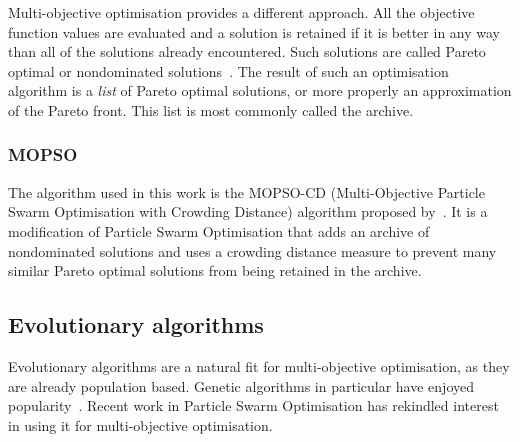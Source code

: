 Multi-objective optimisation provides a different approach.  All the
objective function values are evaluated and a solution is retained if
it is better in any way than all of the solutions already encountered.
Such solutions are called Pareto optimal or nondominated
solutions~\citep{steuer1986multiple}. The result of such an optimisation
algorithm is a \emph{list} of Pareto optimal solutions, or more
properly an approximation of the Pareto front.  This list is most
commonly called the archive.


\subsubsection{MOPSO}\label{sec:mopso}
The algorithm used in this work is the MOPSO-CD (Multi-Objective
Particle Swarm Optimisation with Crowding Distance) algorithm proposed
by~\citet{raquel.naval2005effective}.  It is a modification of Particle Swarm
Optimisation that adds an archive of nondominated solutions and uses a
crowding distance measure to prevent many similar Pareto optimal
solutions from being retained in the archive.


\subsection{Evolutionary algorithms}
Evolutionary algorithms are a natural fit for multi-objective
optimisation, as they are already population based.  Genetic
algorithms in particular have enjoyed
popularity~\citep{deb.kalyanmoy2001multi-objective}.  Recent work in Particle
Swarm Optimisation has rekindled interest in using it for
multi-objective optimisation.



